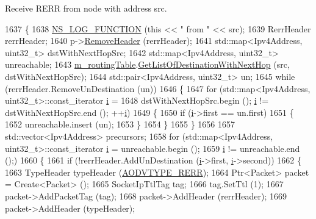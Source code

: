 Receive R\+E\+RR from node with address src. 


\begin{DoxyCode}
1637 \{
1638   \hyperlink{log-macros-disabled_8h_a90b90d5bad1f39cb1b64923ea94c0761}{NS\_LOG\_FUNCTION} (\textcolor{keyword}{this} << \textcolor{stringliteral}{" from "} << src);
1639   RerrHeader rerrHeader;
1640   p->\hyperlink{classns3_1_1Packet_a0961eccf975d75f902d40956c93ba63e}{RemoveHeader} (rerrHeader);
1641   std::map<Ipv4Address, uint32\_t> dstWithNextHopSrc;
1642   std::map<Ipv4Address, uint32\_t> unreachable;
1643   \hyperlink{classns3_1_1aodv_1_1RoutingProtocol_a4e1003a34c8adc96db71096d88c98ae0}{m\_routingTable}.\hyperlink{classns3_1_1aodv_1_1RoutingTable_a0315dabaf863f63cce72eed5c97bd423}{GetListOfDestinationWithNextHop} (src, 
      dstWithNextHopSrc);
1644   std::pair<Ipv4Address, uint32\_t> un;
1645   \textcolor{keywordflow}{while} (rerrHeader.RemoveUnDestination (un))
1646     \{
1647       \textcolor{keywordflow}{for} (std::map<Ipv4Address, uint32\_t>::const\_iterator \hyperlink{bernuolliDistribution_8m_a6f6ccfcf58b31cb6412107d9d5281426}{i} =
1648            dstWithNextHopSrc.begin (); \hyperlink{bernuolliDistribution_8m_a6f6ccfcf58b31cb6412107d9d5281426}{i} != dstWithNextHopSrc.end (); ++\hyperlink{bernuolliDistribution_8m_a6f6ccfcf58b31cb6412107d9d5281426}{i})
1649       \{
1650         \textcolor{keywordflow}{if} (\hyperlink{bernuolliDistribution_8m_a6f6ccfcf58b31cb6412107d9d5281426}{i}->first == un.first)
1651           \{
1652             unreachable.insert (un);
1653           \}
1654       \}
1655     \}
1656 
1657   std::vector<Ipv4Address> precursors;
1658   \textcolor{keywordflow}{for} (std::map<Ipv4Address, uint32\_t>::const\_iterator \hyperlink{bernuolliDistribution_8m_a6f6ccfcf58b31cb6412107d9d5281426}{i} = unreachable.begin ();
1659        \hyperlink{bernuolliDistribution_8m_a6f6ccfcf58b31cb6412107d9d5281426}{i} != unreachable.end ();)
1660     \{
1661       \textcolor{keywordflow}{if} (!rerrHeader.AddUnDestination (\hyperlink{bernuolliDistribution_8m_a6f6ccfcf58b31cb6412107d9d5281426}{i}->first, \hyperlink{bernuolliDistribution_8m_a6f6ccfcf58b31cb6412107d9d5281426}{i}->second))
1662         \{
1663           TypeHeader typeHeader (\hyperlink{namespacens3_1_1aodv_a8cf417608302ba0ed75225c976944d44a363aea0c29a02f5899cf088654c6d844}{AODVTYPE\_RERR});
1664           Ptr<Packet> packet = Create<Packet> ();
1665           SocketIpTtlTag tag;
1666           tag.SetTtl (1);
1667           packet->AddPacketTag (tag);
1668           packet->AddHeader (rerrHeader);
1669           packet->AddHeader (typeHeader);

\end{DoxyCode}
